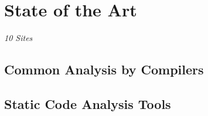 
\chapter{State of the Art}
\label{cha:state of the art}
\emph{10 Sites}

\section{Common Analysis by Compilers}
\section{Static Code Analysis Tools}
